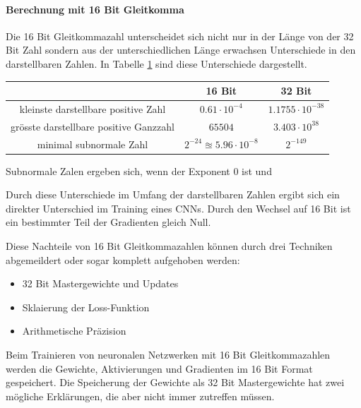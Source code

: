 \paragraph{Berechnung mit 16 Bit Gleitkomma}
\cite{ieee}
Die 16 Bit Gleitkommazahl unterscheidet sich nicht nur in der Länge von der 32 Bit Zahl sondern aus der unterschiedlichen Länge erwachsen Unterschiede in den darstellbaren Zahlen. In Tabelle \ref{tab:numbers} sind diese Unterschiede dargestellt. 

\begin{table}[H]
\label{tab:numbers}
\begin{tabular}{|c|c|c|}
\hline                                       & 16 Bit                             & 32 Bit              \\ \hline
kleinste darstellbare positive Zahl    & $0.61  \cdot 10^{-4}$              & $1.1755 \cdot 10^{-38}$ \\ \hline
grösste darstellbare positive Ganzzahl & $65504$                            & $ 3.403 \cdot 10^{38}$  \\ \hline
minimal subnormale Zahl                & $2^{-24} \approxeq 5.96 \cdot 10^{-8}$ & $ 2^{-149}$         \\ \hline
\end{tabular}
\end{table}

Subnormale Zalen ergeben sich, wenn der Exponent 0 ist und 

Durch diese Unterschiede im Umfang der darstellbaren Zahlen ergibt sich ein direkter Unterschied im Training eines CNNs. Durch den Wechsel auf 16 Bit ist ein bestimmter Teil der Gradienten gleich Null. 

Diese Nachteile von 16 Bit Gleitkommazahlen können durch drei Techniken abgemeildert oder sogar komplett aufgehoben werden:
\begin{itemize}
 \item 32 Bit Mastergewichte und Updates
 \item Sklaierung der Loss-Funktion
 \item Arithmetische Präzision 
\end{itemize}

Beim Trainieren von neuronalen Netzwerken mit 16 Bit Gleitkommazahlen werden die Gewichte, Aktivierungen und Gradienten im 16 Bit Format gespeichert. Die Speicherung der Gewichte als 32 Bit Mastergewichte hat zwei mögliche Erklärungen, die aber nicht immer zutreffen müssen. 

